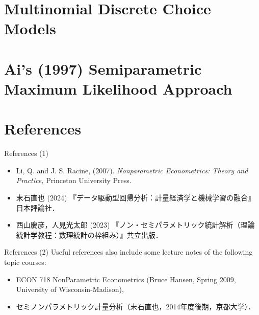 \documentclass[xcolor=svgnames,dvipdfmx,cjk]{beamer}
\theoremstyle{example}
\begin{document}
\section{Multinomial Discrete Choice Models}\begin{frame}
  \tableofcontents[currentsection]
\end{frame}









\section{Ai's (1997) Semiparametric Maximum Likelihood Approach}
\begin{frame}
  \tableofcontents[currentsection]
\end{frame}










\section{References}
\begin{frame}
  \tableofcontents[currentsection]
\end{frame}

\begin{frame}{References (1)}
  \begin{itemize}
    \item Li, Q. and J. S. Racine, (2007). 
          \textit{Nonparametric Econometrics: Theory and Practice,} 
          Princeton University Press.
    \item 末石直也 (2024) 『データ駆動型回帰分析：計量経済学と機械学習の融合』日本評論社．
    \item 西山慶彦，人見光太郎 (2023) 『ノン・セミパラメトリック統計解析（理論統計学教程：数理統計の枠組み）』共立出版．
  \end{itemize}
\end{frame}

\begin{frame}{References (2)}
\quad 
Useful references also include some lecture notes of the following topic courses:
  \begin{itemize}
    \item ECON 718 NonParametric Econometrics (Bruce Hansen, Spring 2009, University of Wisconsin-Madison),
    \item セミノンパラメトリック計量分析（末石直也，2014年度後期，京都大学）．
  \end{itemize}
\end{frame}
\end{document}
